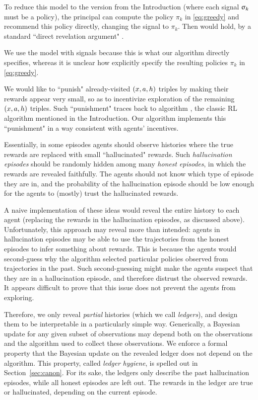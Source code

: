 To reduce this model to the version from the Introduction (where each signal $\upsigma_k$ must be a policy), the principal can compute the policy $\pi_k$ in \eqref{eq:greedy} and recommend this policy directly, changing the signal to $\pi_k$. Then  would hold,
by a standard ``direct revelation argument" \citep{Kremer-JPE14}.

We use the model with signals because this is what our algorithm directly specifies, whereas it is unclear how explicitly specify the resulting policies $\pi_k$ in \eqref{eq:greedy}.

We would like to  ``punish" already-visited $(x,a,h)$ triples by making their rewards appear very small, so as to incentivize exploration of the remaining $(x,a,h)$ triples. Such ``punishment" traces back to \Ecubed{} algorithm \citep{kearns2002near}, the classic RL algorithm mentioned in the Introduction. Our algorithm implements this ``punishment" in a way consistent with agents' incentives.

Essentially, in some episodes agents should observe histories where the true rewards are replaced with small ``hallucinated" rewards. Such \emph{hallucination episodes} should be randomly hidden among many \emph{honest episodes}, in which the rewards are revealed faithfully. The agents should not know which type of episode they are in, and the probability of the hallucination episode should be low enough for the agents to (mostly) trust the hallucinated rewards.

A naive implementation of these ideas would reveal the entire history to each agent (replacing the rewards in the hallucination episodes, as discussed above). Unfortunately, this approach may reveal more than intended: agents in hallucination episodes may be able to use the trajectories from the honest episodes to infer something about rewards. This is because the agents would second-guess why the algorithm selected particular policies observed from trajectories in the past. Such second-guessing might make the agents suspect that they are in a hallucination episode, and therefore distrust the observed rewards. It appears difficult to prove that this issue does not prevent the agents from exploring.

Therefore, we only reveal \emph{partial} histories (which we call \emph{ledgers}), and design them to be interpretable in a particularly simple way. Generically, a Bayesian update for any given subset of observations may depend both on the observations and the algorithm used to collect these observations. We enforce a formal property that the Bayesian update on the revealed ledger does not depend on the algorithm. This property, called \emph{ledger hygiene}, is spelled out in Section~\ref{sec:canon}. For its sake, the ledgers only describe the past hallucination episodes, while all honest episodes are left out. The rewards in the ledger are true or hallucinated, depending on the current episode.

